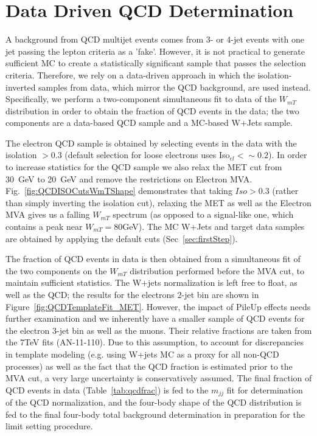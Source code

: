 \section{Data Driven QCD Determination}
\label{sec:dataDrivenQCD}

A background from QCD multijet events comes from 3- or 4-jet events
with one jet passing the lepton criteria as a 'fake'. However, it is
not practical to generate sufficient MC to create a statistically
significant sample that passes the selection criteria. Therefore, we
rely on a data-driven approach in which the isolation-inverted samples
from data, which mirror the QCD background, are used instead.
Specifically, we perform a two-component simultaneous fit to data of
the $W_{mT}$ distribution in order to obtain the fraction of QCD events in
the data; the two components are a data-based QCD sample and a
MC-based W+Jets sample.

The electron QCD sample is obtained by selecting events
in the data with the isolation $>0.3$ (default selection for loose
electrons uses Iso$_{el}<\sim0.2$).  In order to increase statistics
for the QCD sample we also relax the MET cut from 30~GeV to 20~GeV and
remove the restrictions on Electron MVA.
Fig.~\ref{fig:QCDISOCutsWmTShape} demonstrates that taking $Iso>0.3$
(rather than simply inverting the isolation cut), relaxing the MET as
well as the Electron MVA gives us a falling $W_{mT}$ spectrum (as
opposed to a signal-like one, which contains a peak near
$W_{mT}=80$GeV). The MC W+Jets and target data samples are obtained by
applying the default cuts (Sec~\ref{sec:firstStep}).

The fraction of QCD events in data is then obtained from a
simultaneous fit of the two components on the $W_{mT}$ distribution
performed before the MVA cut, to maintain sufficient statistics.
The W+jets normalization is left free to float, as well as the QCD;
the results for the electrons 2-jet bin are shown in Figure~\ref{fig:QCDTemplateFit_MET}. 
However, the impact of PileUp effects 
needs further examination and we inherently have a smaller sample of 
QCD events for the electron 3-jet bin as well as the muons. Their relative fractions 
are taken from the 7TeV fits (AN-11-110).
Due to this assumption, to account for discrepancies in template modeling
(e.g. using W+jets MC as a proxy for all non-QCD processes) as well as the
fact that the QCD fraction is estimated prior to the MVA cut, a very
large uncertainty is conservatively assumed. The final fraction of QCD
events in data (Table~\ref{tab:qcdfrac}) is fed to the $m_{jj}$ fit for determination of the QCD
normalization, and the four-body shape of the QCD distribution is fed
to the final four-body total background determination in preparation
for the limit setting procedure.


